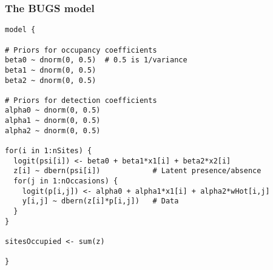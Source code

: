 \documentclass[color=usenames,dvipsnames]{beamer}\usepackage[]{graphicx}\usepackage[]{xcolor}
\makeatletter
\newenvironment{kframe}{%
 \def\at@end@of@kframe{}%
 \ifinner\ifhmode%
  \def\at@end@of@kframe{\end{minipage}}%
  \begin{minipage}{\columnwidth}%
 \fi\fi%
 \def\FrameCommand##1{\hskip\@totalleftmargin \hskip-\fboxsep
 \colorbox{shadecolor}{##1}\hskip-\fboxsep
     \hskip-\linewidth \hskip-\@totalleftmargin \hskip\columnwidth}%
 \MakeFramed {\advance\hsize-\width
   \@totalleftmargin\z@ \linewidth\hsize
   \@setminipage}}%
 {\par\unskip\endMakeFramed%
 \at@end@of@kframe}
\newenvironment{knitrout}{}{} %
\makeatother
\begin{document}
\begin{frame}[fragile]
  \frametitle{The BUGS model}
\begin{knitrout}\scriptsize
{}\color{fgcolor}\begin{kframe}
\begin{verbatim}
model {

# Priors for occupancy coefficients
beta0 ~ dnorm(0, 0.5)  # 0.5 is 1/variance
beta1 ~ dnorm(0, 0.5)
beta2 ~ dnorm(0, 0.5)

# Priors for detection coefficients
alpha0 ~ dnorm(0, 0.5)  
alpha1 ~ dnorm(0, 0.5)
alpha2 ~ dnorm(0, 0.5)

for(i in 1:nSites) {
  logit(psi[i]) <- beta0 + beta1*x1[i] + beta2*x2[i]
  z[i] ~ dbern(psi[i])            # Latent presence/absence
  for(j in 1:nOccasions) {
    logit(p[i,j]) <- alpha0 + alpha1*x1[i] + alpha2*wHot[i,j]
    y[i,j] ~ dbern(z[i]*p[i,j])   # Data
  }
}

sitesOccupied <- sum(z)

}
\end{verbatim}
\end{kframe}
\end{knitrout}
\end{frame}



\end{document}
